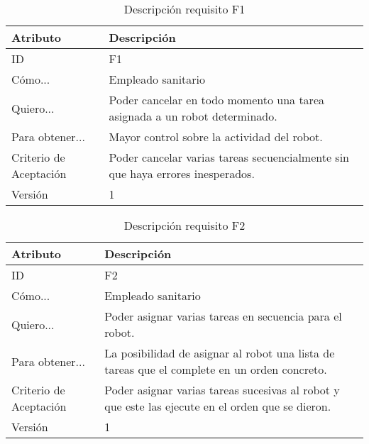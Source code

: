 \begin{table}[H]
    \label{tab:reqF1}
 	\caption{Descripción requisito F1}
	\centering
	
	\begin{tabular}{C{3cm}|C{12cm}}
 		\toprule
 		\textbf{Atributo} & \textbf{Descripción} \\
 		\midrule
 	    ID & F1 \\
 	    Cómo... & Empleado sanitario \\
 	    Quiero... & Poder cancelar en todo momento una tarea asignada a un robot determinado. \\
 	    Para obtener... & Mayor control sobre la actividad del robot. \\
 	    Criterio de Aceptación & Poder cancelar varias tareas secuencialmente sin que haya errores inesperados. \\
 	    Versión & 1 \\
 		\bottomrule
 		\end{tabular}
\end{table}

\begin{table}[H]
    \label{tab:reqF2}
 	\caption{Descripción requisito F2}
	\centering
	
	\begin{tabular}{C{3cm}|C{12cm}}
 		\toprule
 		\textbf{Atributo} & \textbf{Descripción} \\
 		\midrule
 	    ID & F2 \\
 	    Cómo... & Empleado sanitario \\
 	    Quiero... & Poder asignar varias tareas en secuencia para el robot. \\
 	    Para obtener... & La posibilidad de asignar al robot una lista de tareas que el complete en un orden concreto.  \\
 	    Criterio de Aceptación & Poder asignar varias tareas sucesivas al robot y que este las ejecute en el orden que se dieron. \\
 	    Versión & 1 \\
 		\bottomrule
 		\end{tabular}
\end{table}

